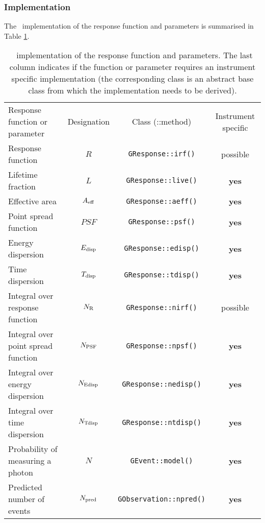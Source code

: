 \documentclass{article}[12pt,a4]
\begin{document}
\subsubsection{Implementation}

The \this\ implementation of the response function and parameters is summarised in 
Table \ref{tab:respar}.

\begin{table}[!h]
\caption{\this\ implementation of the response function and parameters. 
The last column indicates if the function or parameter requires an
instrument specific implementation (the corresponding class is an abstract base class
from which the implementation needs to be derived).
\label{tab:respar}}
\begin{center}
\begin{tabular}{lccc}
\hline
\hline
\noalign{\smallskip}
Response function or parameter & Designation & Class (::method) & Instrument specific \\
\noalign{\smallskip}
\hline
\noalign{\smallskip}
Response function & $R$ & {\tt GResponse::irf()} & possible \\
Lifetime fraction & $L$ & {\tt GResponse::live()} & {\bf yes} \\
Effective area & $A_{\rm eff}$ & {\tt GResponse::aeff()} & {\bf yes} \\
Point spread function & $PSF$ & {\tt GResponse::psf()} & {\bf yes} \\
Energy dispersion & $E_{\rm disp}$ & {\tt GResponse::edisp()} & {\bf yes} \\
Time dispersion & $T_{\rm disp}$ & {\tt GResponse::tdisp()} & {\bf yes} \\
Integral over response function & $N_{\rm R}$ & {\tt GResponse::nirf()} & possible \\
Integral over point spread function & $N_{\rm PSF}$ & {\tt GResponse::npsf()} & {\bf yes} \\
Integral over energy dispersion & $N_{\rm Edisp}$ & {\tt GResponse::nedisp()} & {\bf yes} \\
Integral over time dispersion & $N_{\rm Tdisp}$ & {\tt GResponse::ntdisp()} & {\bf yes} \\
Probability of measuring a photon & $N$ & {\tt GEvent::model()} & {\bf yes} \\
Predicted number of events & $N_{\rm pred}$ & {\tt GObservation::npred()} & {\bf yes} \\

\end{tabular}
\end{center}
\end{table}
\end{document}
